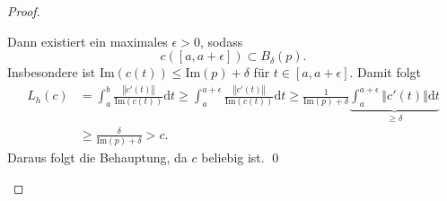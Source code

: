 \begin{theorem}
\begin{proof}
\begin{itemize}
      Dann existiert ein maximales \( \epsilon > 0 \), sodass
      \begin{equation*}
        c([a, a + \epsilon]) \subset B_\delta(p)\text{.}
      \end{equation*}
      Insbesondere ist \( \text{Im}(c(t)) \leq \text{Im}(p) + \delta \) für \( t \in [a, a + \epsilon] \). Damit folgt
      \begin{align*}
        L_h(c) &= \int_a^b \frac{\left\Vert c'(t) \right\Vert}{\text{Im}(c(t))}\text{d}t \geq \int_a^{a + \epsilon} \frac{\left\Vert c'(t) \right\Vert}{\text{Im}(c(t))}\text{d}t \geq \frac{1}{\text{Im}(p) + \delta} \underbrace{\int_a^{a + \epsilon}\left\Vert c'(t) \right\Vert \text{d}t}_{\geq \delta} \\
        &\geq \frac{\delta}{\text{Im}(p) + \delta} > c\text{.}
      \end{align*}
      Daraus folgt die Behauptung, da \( c \) beliebig ist. \qed{}
    \end{itemize}
  \end{proof}
\end{theorem}

